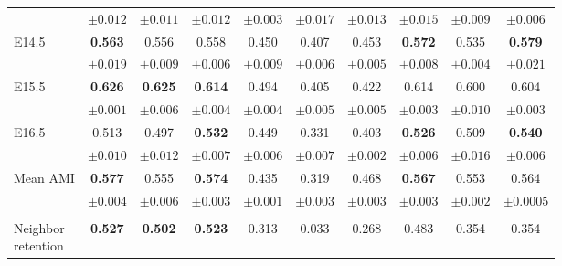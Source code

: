 \begin{tabular}{lccccccccc}
 & {\scriptsize $\pm 0.012$} & {\scriptsize $\pm 0.011$} & {\scriptsize $\pm 0.012$} & {\scriptsize $\pm 0.003$} & {\scriptsize $\pm 0.017$} & {\scriptsize $\pm 0.013$} & {\scriptsize $\pm 0.015$} & {\scriptsize $\pm 0.009$} & {\scriptsize $\pm 0.006$} \\
\addlinespace[2pt]
E14.5 & \textbf{0.563} & 0.556 & 0.558 & 0.450 & 0.407 & 0.453 & \textbf{0.572} & 0.535 & \textbf{0.579} \\
 & {\scriptsize $\pm 0.019$} & {\scriptsize $\pm 0.009$} & {\scriptsize $\pm 0.006$} & {\scriptsize $\pm 0.009$} & {\scriptsize $\pm 0.006$} & {\scriptsize $\pm 0.005$} & {\scriptsize $\pm 0.008$} & {\scriptsize $\pm 0.004$} & {\scriptsize $\pm 0.021$} \\
\addlinespace[2pt]
E15.5 & \textbf{0.626} & \textbf{0.625} & \textbf{0.614} & 0.494 & 0.405 & 0.422 & 0.614 & 0.600 & 0.604 \\
 & {\scriptsize $\pm 0.001$} & {\scriptsize $\pm 0.006$} & {\scriptsize $\pm 0.004$} & {\scriptsize $\pm 0.004$} & {\scriptsize $\pm 0.005$} & {\scriptsize $\pm 0.005$} & {\scriptsize $\pm 0.003$} & {\scriptsize $\pm 0.010$} & {\scriptsize $\pm 0.003$} \\
\addlinespace[2pt]
E16.5 & 0.513 & 0.497 & \textbf{0.532} & 0.449 & 0.331 & 0.403 & \textbf{0.526} & 0.509 & \textbf{0.540} \\
 & {\scriptsize $\pm 0.010$} & {\scriptsize $\pm 0.012$} & {\scriptsize $\pm 0.007$} & {\scriptsize $\pm 0.006$} & {\scriptsize $\pm 0.007$} & {\scriptsize $\pm 0.002$} & {\scriptsize $\pm 0.006$} & {\scriptsize $\pm 0.016$} & {\scriptsize $\pm 0.006$} \\
\addlinespace[2pt]
Mean AMI & \textbf{0.577} & 0.555 & \textbf{0.574} & 0.435 & 0.319 & 0.468 & \textbf{0.567} & 0.553 & 0.564 \\
 & {\scriptsize $\pm 0.004$} & {\scriptsize $\pm 0.006$} & {\scriptsize $\pm 0.003$} & {\scriptsize $\pm 0.001$} & {\scriptsize $\pm 0.003$} & {\scriptsize $\pm 0.003$} & {\scriptsize $\pm 0.003$} & {\scriptsize $\pm 0.002$} & {\scriptsize $\pm 0.0005$} \\
\addlinespace[2pt]
\midrule
\multicolumn{10}{l}{\textbf{(b) Local spatial organization} $\uparrow$} \\
\shortstack{Neighbor\\retention} & \textbf{0.527} & \textbf{0.502} & \textbf{0.523} & 0.313 & 0.033 & 0.268 & 0.483 & 0.354 & 0.354 \\
\bottomrule
\end{tabular}
